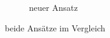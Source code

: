 \begin{figure}[!htb]
\begin{subfigure}{.5\textwidth}
		\caption{neuer Ansatz}
		\label{fig:newSetup}
	\end{subfigure}
	\caption{beide Ansätze im Vergleich}
	\label{fig:renderedSetup}
\end{figure}
